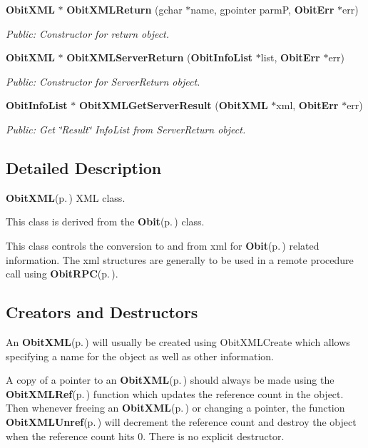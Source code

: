 \begin{CompactItemize}
{\bf Obit\-XML} $\ast$ {\bf Obit\-XMLReturn} (gchar $\ast$name, gpointer parm\-P, {\bf Obit\-Err} $\ast$err)
\begin{CompactList}\small\item\em Public: Constructor for return object. \item\end{CompactList}\item 
{\bf Obit\-XML} $\ast$ {\bf Obit\-XMLServer\-Return} ({\bf Obit\-Info\-List} $\ast$list, {\bf Obit\-Err} $\ast$err)
\begin{CompactList}\small\item\em Public: Constructor for Server\-Return object. \item\end{CompactList}\item 
{\bf Obit\-Info\-List} $\ast$ {\bf Obit\-XMLGet\-Server\-Result} ({\bf Obit\-XML} $\ast$xml, {\bf Obit\-Err} $\ast$err)
\begin{CompactList}\small\item\em Public: Get \char`\"{}Result\char`\"{} Info\-List from Server\-Return object. \item\end{CompactList}\end{CompactItemize}


\subsection{Detailed Description}
{\bf Obit\-XML}{\rm (p.\,\pageref{structObitXML})} XML class. 

This class is derived from the {\bf Obit}{\rm (p.\,\pageref{structObit})} class.

This class controls the conversion to and from xml for {\bf Obit}{\rm (p.\,\pageref{structObit})} related information. The xml structures are generally to be used in a remote procedure call using {\bf Obit\-RPC}{\rm (p.\,\pageref{structObitRPC})}.\subsection{Creators and Destructors}\label{ObitXML_8h_ObitXMLaccess}
An {\bf Obit\-XML}{\rm (p.\,\pageref{structObitXML})} will usually be created using Obit\-XMLCreate which allows specifying a name for the object as well as other information.

A copy of a pointer to an {\bf Obit\-XML}{\rm (p.\,\pageref{structObitXML})} should always be made using the {\bf Obit\-XMLRef}{\rm (p.\,\pageref{ObitXML_8h_a1})} function which updates the reference count in the object. Then whenever freeing an {\bf Obit\-XML}{\rm (p.\,\pageref{structObitXML})} or changing a pointer, the function {\bf Obit\-XMLUnref}{\rm (p.\,\pageref{ObitXML_8h_a0})} will decrement the reference count and destroy the object when the reference count hits 0. There is no explicit destructor.

